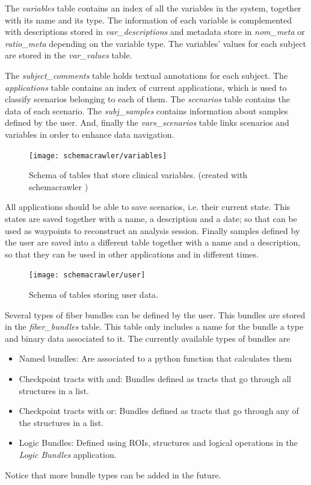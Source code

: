 The \emph{variables} table contains an index of all the variables in the system, together with its name and its type. The information of each variable is complemented with descriptions stored in \emph{var\_descriptions} and metadata store in \emph{nom\_meta} or \emph{ratio\_meta} depending on the variable type. The variables' values for each subject are stored in the \emph{var\_values} table.


The \emph{subject\_comments} table holds textual annotations for each subject. The \emph{applications} table contains an index of current applications, which is used to classify scenarios belonging to each of them. The \emph{scenarios} table contains the data of each scenario. The \emph{subj\_samples} contains information about samples defined by the user. And, finally the \emph{vars\_scenarios} table links scenarios and variables in order to enhance data navigation.

\begin{figure}
\centering
\texttt{[image: schemacrawler/variables]}%
\caption{\label{fig_db_variables}Schema of tables that store clinical variables. (created with schemacrawler \autocite{_schemacrawler_????})}
\end{figure}

All applications should be able to save scenarios, i.e. their current state. This states are saved together with a name, a description and a date; so that can be used as waypoints to reconstruct an analysis session. Finally samples defined by the user are saved into a different table together with a name and a description, so that they can be used in other applications and in different times.

\begin{figure}
\centering
\texttt{[image: schemacrawler/user]}%
\caption{\label{fig_db_user}Schema of tables storing user data. }
\end{figure}

Several types of fiber bundles can be defined by the user. This bundles are stored in the \emph{fiber\_bundles} table. This table only includes a name for the bundle a type and binary data associated to it. The currently available types of bundles are
\begin{itemize}
\item Named bundles: Are associated to a python function that calculates them
\item Checkpoint tracts with and: Bundles defined as tracts that go through all structures in a list.
\item Checkpoint tracts with or: Bundles defined as tracts that go through any of the structures in a list.
\item Logic Bundles: Defined using ROIs, structures and logical operations in the \emph{Logic Bundles} application.
\end{itemize}
Notice that more bundle types can be added in the future.


